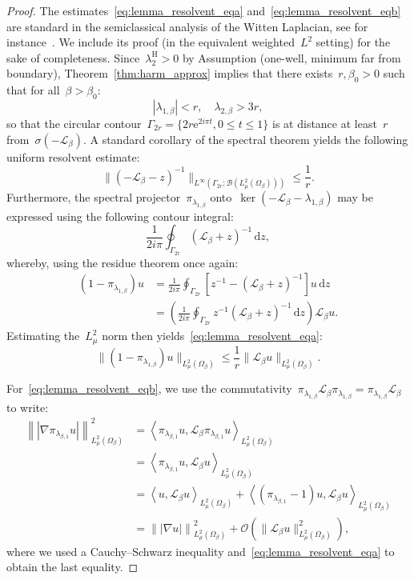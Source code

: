\documentclass[10pt]{article}
\newcommand{\cL}{\mathcal{L}}
\renewcommand{\d}{\mathrm{d}}
\newcommand{\e}{\mathrm{e}}
\newcommand{\1}{\mathbbm 1}
\renewcommand{\O}{\mathcal{O}}
\begin{document}
        \begin{proof}
            The estimates~\eqref{eq:lemma_resolvent_eqa} and~\eqref{eq:lemma_resolvent_eqb} are standard in the semiclassical analysis of the Witten Laplacian, see for instance~\cite[Proposition 27]{LPN21}. 
            We include its proof (in the equivalent weighted~$L^2$ setting) for the sake of completeness.
            Since~$\lambda_{2}^{\mathrm H}>0$ by Assumption (one-well, minimum far from boundary), Theorem~\ref{thm:harm_approx} implies that there exists~$r,\beta_0>0$ such that for all~$\beta>\beta_0$:
            \[|\lambda_{1,\beta}| <r,\quad \lambda_{2,\beta}>3r,\]
            so that the circular contour~$\Gamma_{2r} = \{2r\e^{2i\pi t}, 0\leq t \leq 1\}$ is at distance at least~$r$ from~$\sigma(-\cL_\beta)$.
            A standard corollary of the spectral theorem yields the following uniform resolvent estimate:
            \[\|(-\cL_\beta-z)^{-1}\|_{L^\infty\left(\Gamma_{2r};\mathcal B(L^2_\mu(\Omega_\beta))\right)} \leq \frac 1r.\]
            Furthermore, the spectral projector~$\pi_{\lambda_{1,\beta}}$ onto~$\ker(-\cL_\beta-\lambda_{1,\beta})$ may be expressed using the following contour integral:
            \begin{equation}
                \frac{1}{2i\pi}\oint_{\Gamma_{2r}}(\cL_\beta+z)^{-1}\,\d z,
            \end{equation}
            whereby, using the residue theorem once again:
            \begin{align*}
                (1-\pi_{\lambda_{1,\beta}})u &= \frac{1}{2i\pi}\oint_{\Gamma_{2r}} \left[z^{-1}-(\cL_\beta+z)^{-1}\right]u\,\d z\\
                &= \left(\frac{1}{2i\pi}\oint_{\Gamma_{2r}}z^{-1}(\cL_\beta+z)^{-1}\,\d z\right)\cL_\beta u.
            \end{align*}
            Estimating the~$L^2_\mu$ norm then yields~\eqref{eq:lemma_resolvent_eqa}:
            \[\|(1-\pi_{\lambda_{1,\beta}})u\|_{L^2_\mu(\Omega_\beta)} \leq \frac1r\|\cL_\beta u\|_{L^2_\mu(\Omega_\beta)}.
                \]

            For~\eqref{eq:lemma_resolvent_eqb}, we use the commutativity~$\pi_{\lambda_{1,\beta}}\cL_\beta\pi_{\lambda_{1,\beta}} = \pi_{\lambda_{1,\beta}}\cL_\beta$ to write:
            \begin{align*}
                \left\||\nabla \pi_{\lambda_{\beta,1}}u|\right\|^2_{L^2_\mu(\Omega_\beta)} &= \left\langle \pi_{\lambda_{\beta,1}}u , \cL_\beta \pi_{\lambda_{\beta,1}}u\right\rangle_{L^2_\mu(\Omega_\beta)}\\
                &= \left\langle \pi_{\lambda_{\beta,1}}u,\cL_\beta u\right\rangle_{L^2_\mu(\Omega_\beta)}\\
                &=\left\langle u,\cL_\beta u\right\rangle_{L^2_\mu(\Omega_\beta)} + \left\langle (\pi_{\lambda_{\beta,1}}-1)u,\cL_\beta u\right\rangle_{L^2_\mu(\Omega_\beta)}\\
                &= \left\||\nabla u|\right\|_{L^2_\mu(\Omega_\beta)}^2 + \O(\|\cL_\beta u\|_{L^2_\mu(\Omega_\beta)}^2),
            \end{align*}
            where we used a Cauchy--Schwarz inequality and~\eqref{eq:lemma_resolvent_eqa} to obtain the last equality.
        \end{proof}
\end{document}
